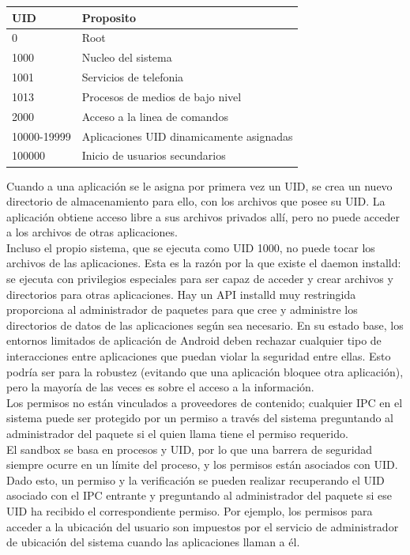 \documentclass[a4paper]{article}
\begin{document}
\begin{center}
    \begin{tabular}{ | l | p{5cm}|}
    \hline
    \textbf{UID} & \textbf{Proposito}  \\ \hline
    0 & Root   \\ \hline
    1000 & Nucleo del sistema \\ \hline
    1001 & Servicios de telefonia \\ \hline
    1013 & Procesos de medios de bajo nivel \\ \hline
    2000 &  Acceso a la linea de comandos\\ \hline
    10000-19999 &  Aplicaciones UID dinamicamente asignadas\\ \hline
    100000 & Inicio de usuarios secundarios  \\ \hline
    \end{tabular}
\end{center}

Cuando a una aplicación se le asigna por primera vez un UID, se crea un nuevo directorio de almacenamiento para ello, con los archivos que posee su UID. La aplicación obtiene acceso libre a sus archivos privados allí, pero no puede acceder a los archivos de otras aplicaciones.\\
Incluso el propio sistema, que se ejecuta como UID 1000, no puede tocar los archivos de las aplicaciones. Esta es la razón por la que existe el daemon installd: se ejecuta con privilegios especiales para ser capaz de acceder y crear archivos y directorios para otras aplicaciones. Hay un API installd muy restringida proporciona al administrador de paquetes para que cree y administre los directorios de datos de las aplicaciones según sea necesario.
En su estado base, los entornos limitados de aplicación de Android deben rechazar cualquier tipo de interacciones entre aplicaciones que puedan violar la seguridad entre ellas. Esto podría ser para la robustez (evitando que una aplicación bloquee otra aplicación), pero la mayoría de las veces es sobre el acceso a la información.\\

Los permisos no están vinculados a proveedores de contenido; cualquier IPC en el sistema puede ser protegido por un permiso a través del sistema preguntando al administrador del paquete si el quien llama tiene el permiso requerido.\\

El sandbox se basa en procesos y UID, por lo que una barrera de seguridad siempre ocurre en un límite del proceso, y los permisos están asociados con UID. Dado esto, un permiso
y la verificación se pueden realizar recuperando el UID asociado con el IPC entrante
y preguntando al administrador del paquete si ese UID ha recibido el correspondiente
permiso. Por ejemplo, los permisos para acceder a la ubicación del usuario son
impuestos por el servicio de administrador de ubicación del sistema cuando las aplicaciones llaman a él.\\
\end{document}

